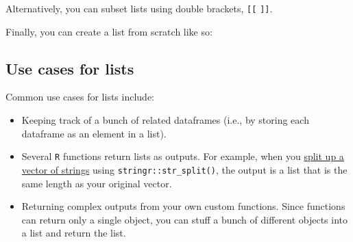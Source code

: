 \documentclass[]{book}
\newenvironment{Shaded}{\begin{snugshade}}{\end{snugshade}}
\newcommand{\DecValTok}[1]{\textcolor[rgb]{0.00,0.00,0.81}{#1}}
\newcommand{\KeywordTok}[1]{\textcolor[rgb]{0.13,0.29,0.53}{\textbf{#1}}}
\newcommand{\NormalTok}[1]{#1}
\newcommand{\OperatorTok}[1]{\textcolor[rgb]{0.81,0.36,0.00}{\textbf{#1}}}
\newcommand{\StringTok}[1]{\textcolor[rgb]{0.31,0.60,0.02}{#1}}
\begin{document}
Alternatively, you can subset lists using double brackets, \texttt{{[}{[}} \texttt{{]}{]}}.

\begin{Shaded}
\end{Shaded}

Finally, you can create a list from scratch like so:

\begin{Shaded}
\end{Shaded}

\hypertarget{use-cases-for-lists}{%
\subsection*{Use cases for lists}\label{use-cases-for-lists}}

Common use cases for lists include:

\begin{itemize}
\item
  Keeping track of a bunch of related dataframes (i.e., by storing each dataframe as an element in a list).
\item
  Several \texttt{R} functions return lists as outputs. For example, when you \protect\hyperlink{text}{split up a vector of strings} using \texttt{stringr::str\_split()}, the output is a list that is the same length as your original vector.
\item
  Returning complex outputs from your own custom functions. Since functions can return only a single object, you can stuff a bunch of different objects into a list and return the list.
\end{itemize}
\end{document}
